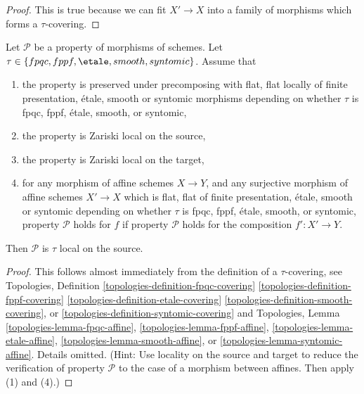 \begin{proof}
This is true because we can fit $X' \to X$ into a family of
morphisms which forms a $\tau$-covering.
\end{proof}

\begin{lemma}
\label{lemma-properties-morphisms-local-source}
Let $\mathcal{P}$ be a property of morphisms of schemes.
Let $\tau \in \{fpqc, \linebreak[0] fppf, \linebreak[0]
\etale, \linebreak[0] smooth, \linebreak[0] syntomic\}$.
Assume that
\begin{enumerate}
\item the property is preserved under precomposing with
flat, flat locally of finite presentation, \'etale, smooth or syntomic morphisms
depending on whether $\tau$ is fpqc, fppf, \'etale, smooth, or syntomic,
\item the property is Zariski local on the source,
\item the property is Zariski local on the target,
\item for any morphism of affine schemes $X \to Y$, and
any surjective morphism of affine schemes $X' \to X$
which is flat, flat of finite presentation,
\'etale, smooth or syntomic depending on whether $\tau$ is
fpqc, fppf, \'etale, smooth, or syntomic, property
$\mathcal{P}$ holds for $f$ if property $\mathcal{P}$
holds for the composition $f' : X' \to Y$.
\end{enumerate}
Then $\mathcal{P}$ is $\tau$ local on the source.
\end{lemma}

\begin{proof}
This follows almost immediately from the definition of
a $\tau$-covering, see
Topologies, Definition
\ref{topologies-definition-fpqc-covering}
\ref{topologies-definition-fppf-covering}
\ref{topologies-definition-etale-covering}
\ref{topologies-definition-smooth-covering}, or
\ref{topologies-definition-syntomic-covering}
and Topologies, Lemma
\ref{topologies-lemma-fpqc-affine},
\ref{topologies-lemma-fppf-affine},
\ref{topologies-lemma-etale-affine},
\ref{topologies-lemma-smooth-affine}, or
\ref{topologies-lemma-syntomic-affine}.
Details omitted. (Hint: Use locality on the source and target to
reduce the verification of property $\mathcal{P}$ to the case of
a morphism between affines. Then apply (1) and (4).)
\end{proof}

